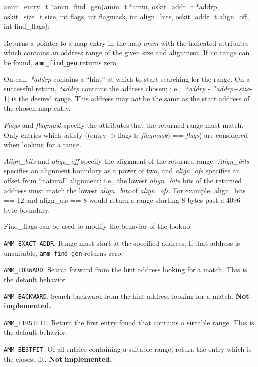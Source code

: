 \begin{apisyn}

	\funcproto amm_entry_t *amm_find_gen(amm_t *amm,
			       \inoutparam oskit_addr_t *addrp,
			       oskit_size_t size, int flags, int flagmask,
			       int align_bits, oskit_addr_t align_off,
			       int find_flags);
\end{apisyn}
\begin{apidesc}
	Returns a pointer to a map entry in the map \emph{amm} with
	the indicated attributes which contains
	an address range of the given size and alignment.
	If no range can be found, {\tt amm_find_gen} returns zero.

	On call, \emph{*addrp} contains a ``hint'' at which to start
	searching for the range.
	On a successful return, \emph{*addrp} contains the address chosen;
	i.e., [\emph{*addrp} - \emph{*addrp}+\emph{size}-1] is the desired range.
	This address may \emph{not} be the same as the start address of the
	chosen map entry.

	\emph{Flags} and \emph{flagmask} specify the attributes that the
	returned range must match.
	Only entries which satisfy
	((entry-$>$flags \& \emph{flagmask}) == \emph{flags})
	are considered when looking for a range.

	\emph{Align_bits} and \emph{align_off} specify the alignment of the
	returned range.
	\emph{Align_bits} specifies an alignment boundary as a power of two,
	and \emph{align_ofs} specifies an offset from ``natural'' alignment;
	i.e., the lowest \emph{align_bits} bits of the returned address
	must match the lowest \emph{align_bits} of \emph{align_ofs}.
	For example, align_bits == 12 and align_ofs == 8 would return a
	range starting 8 bytes past a 4096 byte boundary.

	{Find_flags} can be used to modify the behavior of the lookup:

	{\tt AMM_EXACT_ADDR}.
		Range must start at the specified address.
		If that address is unsuitable, {\tt amm_find_gen} returns zero.

	{\tt AMM_FORWARD}.
		Search forward from the hint address looking for a match.
		This is the default behavior.

	{\tt AMM_BACKWARD}.
		Search backward from the hint address looking for a match.
		{\bf Not implemented.}

	{\tt AMM_FIRSTFIT}.
		Return the first entry found that contains a suitable range.
		This is the default behavior.

	{\tt AMM_BESTFIT}.
		Of all entries containing a suitable range,
		return the entry which is the closest fit.
		{\bf Not implemented.}
\end{apidesc}
